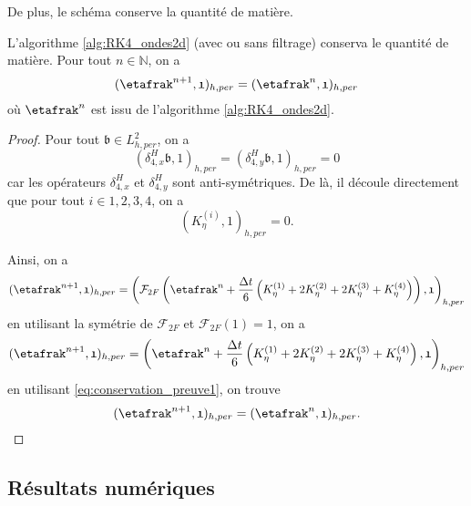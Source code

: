 De plus, le schéma conserve la quantité de matière.
\begin{proposition}
L'algorithme \ref{alg:RK4_ondes2d} (avec ou sans filtrage) conserva le quantité de matière. Pour tout $n \in \mathbb{N}$, on a 
\begin{equation}
(\etafrak^{n+1} , \mathfrak{1})_{h,per} = (\etafrak^{n} , \mathfrak{1})_{h,per}
\end{equation}
où $\etafrak^n$ est issu de l'algorithme \ref{alg:RK4_ondes2d}.
\end{proposition}

\begin{proof}
Pour tout $\mathfrak{b} \in L^2_{h,per}$, on a 
\begin{equation}
(\delta_{4,x}^H \mathfrak{b}, \mathfrak{1})_{h,per} = (\delta_{4,y}^H \mathfrak{b}, \mathfrak{1})_{h,per} = 0
\end{equation}
car les opérateurs $\delta_{4,x}^H$ et $\delta_{4,y}^H$ sont anti-symétriques. De là, il découle directement que pour tout $i \in {1,2,3,4}$, on a 
\begin{equation}
(K_{\eta}^{(i)}, \mathfrak{1})_{h,per} = 0.
\label{eq:conservation_preuve1}
\end{equation}

Ainsi, on a
\begin{equation}
(\etafrak^{n+1}, \mathfrak{1})_{h,per} = \left( \mathcal{F}_{2F}\left( \etafrak^n  + \dfrac{\Delta t}{6} \left( K^{(1)}_{\eta} + 2 K^{(2)}_{\eta} + 2 K^{(3)}_{\eta} + K^{(4)}_{\eta} \right) \right) , \mathfrak{1} \right)_{h,per}
\end{equation}
en utilisant la symétrie de $\mathcal{F}_{2F}$ et $\mathcal{F}_{2F}(\mathfrak{1}) = \mathfrak{1}$, on a
\begin{equation}
(\etafrak^{n+1}, \mathfrak{1})_{h,per} = \left( \etafrak^n  + \dfrac{\Delta t}{6} \left( K^{(1)}_{\eta} + 2 K^{(2)}_{\eta} + 2 K^{(3)}_{\eta} + K^{(4)}_{\eta} \right) , \mathfrak{1}\right)_{h,per}
\end{equation}
en utilisant \eqref{eq:conservation_preuve1}, on trouve
\begin{equation}
(\etafrak^{n+1} , \mathfrak{1})_{h,per} = (\etafrak^{n} , \mathfrak{1})_{h,per}.
\end{equation}
\end{proof}









\subsection{Résultats numériques}

